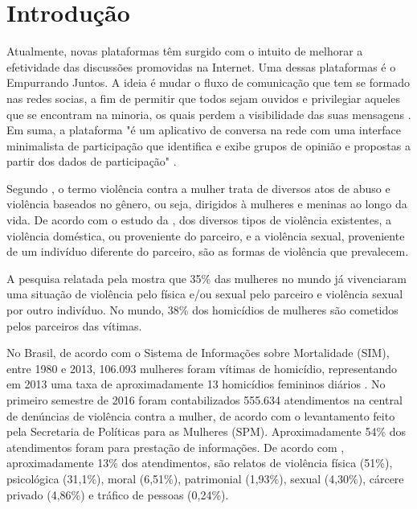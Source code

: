 \chapter[Introdução]{Introdução} \label{cap:introducao}

Atualmente, novas plataformas têm surgido com o intuito de melhorar a efetividade das discussões promovidas na Internet. 
Uma dessas plataformas é o Empurrando Juntos. A ideia é mudar o fluxo de comunicação que tem se formado nas redes socias, 
a fim de permitir que todos sejam ouvidos e privilegiar aqueles que se encontram na minoria, 
os quais perdem a visibilidade das suas mensagens \cite{empurrandojuntos}. 
Em suma, a plataforma "é um aplicativo de conversa na rede com uma interface minimalista de participação que identifica e 
exibe grupos de opinião e propostas a partir dos dados de participação" \cite{empurrandojuntos}.

Segundo , o termo violência contra a mulher trata de
diversos atos de abuso e violência baseados no gênero, ou seja, dirigidos à mulheres e meninas ao longo da vida.
De acordo com o estudo da , dos diversos tipos de violência existentes, a violência doméstica, ou proveniente do parceiro,
e a violência sexual, proveniente de um indivíduo diferente do parceiro, são as formas de violência que prevalecem.

A pesquisa relatada pela  mostra que 35\% das mulheres no mundo já vivenciaram uma situação
de violência pelo física e/ou sexual pelo parceiro e violência sexual por outro indivíduo. No mundo, 38\% dos homicídios de mulheres são cometidos 
pelos parceiros das vítimas.

No Brasil, de acordo com o Sistema de Informações sobre Mortalidade (SIM), entre 1980 e 2013, 106.093 mulheres foram vítimas de homicídio, representando em 2013 uma taxa de aproximadamente 13 homicídios femininos
diários \cite{mapa_violencia_2015}. 
No primeiro semestre de 2016 foram contabilizados 555.634 atendimentos na central de denúncias 
de violência contra a mulher, de acordo com o levantamento feito pela Secretaria de Políticas para as Mulheres (SPM). 
Aproximadamente 54\% dos atendimentos foram para prestação de informações. De acordo com \cite{portal_180}, aproximadamente 13\% dos atendimentos, 
são relatos de violência física (51\%), psicológica (31,1\%), moral (6,51\%), patrimonial (1,93\%), sexual (4,30\%), cárcere privado (4,86\%) e tráfico de pessoas (0,24\%).

